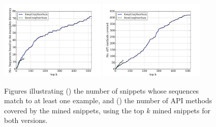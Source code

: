 \begin{figure}[H]
\ffigbox
{%
  \begin{subfloatrow}[2]
  \ffigbox[\FBwidth]
    {\caption{}\label{res:exp2-calls-precision}}
    {\includegraphics[width=0.45\textwidth]{results/exp2-calls-precision.pdf}}
  \hspace{1em}%
  \ffigbox[\FBwidth]
    {\caption{}\label{res:exp2-coverage}}
    {\includegraphics[width=0.45\textwidth]{results/exp2-coverage.pdf}}
  \end{subfloatrow}}
  {\caption[Illustration of the precision and coverage\protect\\($RemUniqNaivSum$, $RemUniqNaivSum$)]{Figures illustrating () the number of snippets whose sequences match to at least one example, and () the number of API methods covered by the mined snippets, using the top $k$ mined snippets for both versions.}
\label{res:exp2-calls-prec-coverage}}
\end{figure}

\vspace{-20pt}

